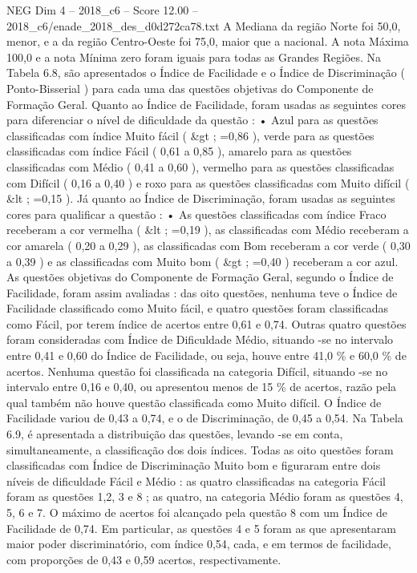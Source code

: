 \begin{textsample}{NEG Dim 4 – 2018\_c6 – Score 12.00 – 2018\_c6/enade\_2018\_des\_d0d272ca78.txt}
A Mediana da região Norte foi 50,0, menor, e a da região Centro-Oeste foi 75,0, maior que a nacional.
A nota Máxima 100,0 e a nota Mínima zero foram iguais para todas as Grandes Regiões.
Na Tabela 6.8, são apresentados o Índice de Facilidade e o Índice de Discriminação ( Ponto-Bisserial ) para cada uma das questões objetivas do Componente de Formação Geral.
Quanto ao Índice de Facilidade, foram usadas as seguintes cores para diferenciar o nível de dificuldade da questão : • Azul para as questões classificadas com índice Muito fácil ( \&gt ; =0,86 ), verde para as questões classificadas com índice Fácil ( 0,61 a 0,85 ), amarelo para as questões classificadas com Médio ( 0,41 a 0,60 ), vermelho para as questões classificadas com Difícil ( 0,16 a 0,40 ) e roxo para as questões classificadas com Muito difícil ( \&lt ; =0,15 ).
Já quanto ao Índice de Discriminação, foram usadas as seguintes cores para qualificar a questão : • As questões classificadas com índice Fraco receberam a cor vermelha ( \&lt ; =0,19 ), as classificadas com Médio receberam a cor amarela ( 0,20 a 0,29 ), as classificadas com Bom receberam a cor verde ( 0,30 a 0,39 ) e as classificadas com Muito bom ( \&gt ; =0,40 ) receberam a cor azul.
As questões objetivas do Componente de Formação Geral, segundo o Índice de Facilidade, foram assim avaliadas : das oito questões, nenhuma teve o Índice de Facilidade classificado como Muito fácil, e quatro questões foram classificadas como Fácil, por terem índice de acertos entre 0,61 e 0,74.
Outras quatro questões foram consideradas com Índice de Dificuldade Médio, situando -se no intervalo entre 0,41 e 0,60 do Índice de Facilidade, ou seja, houve entre 41,0 \% e 60,0 \% de acertos.
Nenhuma questão foi classificada na categoria Difícil, situando -se no intervalo entre 0,16 e 0,40, ou apresentou menos de 15 \% de acertos, razão pela qual também não houve questão classificada como Muito difícil.
O Índice de Facilidade variou de 0,43 a 0,74, e o de Discriminação, de 0,45 a 0,54.
Na Tabela 6.9, é apresentada a distribuição das questões, levando -se em conta, simultaneamente, a classificação dos dois índices.
Todas as oito questões foram classificadas com Índice de Discriminação Muito bom e figuraram entre dois níveis de dificuldade Fácil e Médio : as quatro classificadas na categoria Fácil foram as questões 1,2, 3 e 8 ; as quatro, na categoria Médio foram as questões 4, 5, 6 e 7.
O máximo de acertos foi alcançado pela questão 8 com um Índice de Facilidade de 0,74.
Em particular, as questões 4 e 5 foram as que apresentaram maior poder discriminatório, com índice 0,54, cada, e em termos de facilidade, com proporções de 0,43 e 0,59 acertos, respectivamente.

\end{textsample}
